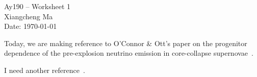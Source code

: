 \documentclass[11pt,letterpaper]{article}
\begin{document}
\begin{center}
\Large
Ay190 -- Worksheet 1\\
Xiangcheng Ma\\
Date: \today
\end{center}

Today, we are making reference to O'Connor \& Ott's paper on the
progenitor dependence of the pre-explosion neutrino emission in
core-collapse supernovae~\cite{oconnor:13}.

I need another reference~\cite{ma:13}.




\end{document}
